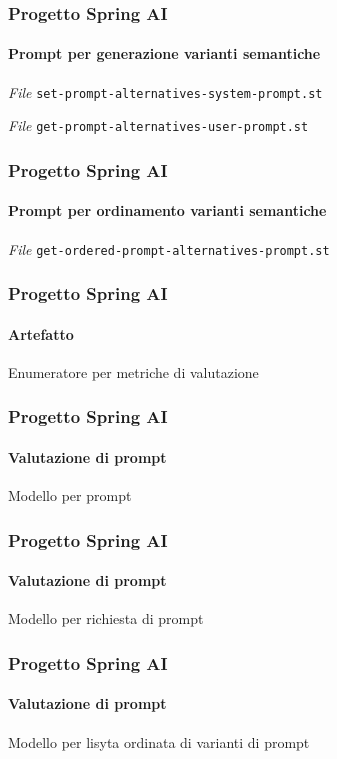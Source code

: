 %
\begin{frame}[t,fragile] \frametitle{Progetto Spring AI}
    \framesubtitle{Prompt per generazione varianti semantiche}
        \begin{block}{\textit{File} \texttt{set-prompt-alternatives-system-prompt.st}}
			{\scriptsize}
    	\end{block}
        \vspace*{.3cm}
        \begin{block}{\textit{File} \texttt{get-prompt-alternatives-user-prompt.st}}
			{\scriptsize}
    	\end{block}
\end{frame}
%
\begin{frame}[t,fragile] \frametitle{Progetto Spring AI}
    \framesubtitle{Prompt per ordinamento varianti semantiche}
        \begin{block}{\textit{File} \texttt{get-ordered-prompt-alternatives-prompt.st}}
			{\scriptsize}
    	\end{block}
\end{frame}
%
\begin{frame}[t,fragile] \frametitle{Progetto Spring AI}
    \framesubtitle{Artefatto}
        \begin{block}{Enumeratore per metriche di valutazione}
			{\Tiny}
    	\end{block}
\end{frame}
%
\begin{frame}[t,fragile] \frametitle{Progetto Spring AI}
    \framesubtitle{Valutazione di prompt}
        \begin{block}{Modello per prompt}
			{\tiny}
    	\end{block}
\end{frame}
%
\begin{frame}[t,fragile] \frametitle{Progetto Spring AI}
    \framesubtitle{Valutazione di prompt}
        \begin{block}{Modello per richiesta di prompt}
			{\tiny}
    	\end{block}
\end{frame}
%
\begin{frame}[t,fragile] \frametitle{Progetto Spring AI}
    \framesubtitle{Valutazione di prompt}
        \begin{block}{Modello per lisyta ordinata di varianti di prompt}
			{\tiny}
    	\end{block}
\end{frame}
